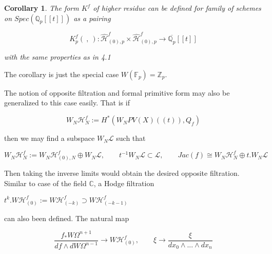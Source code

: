 \documentclass[12pt,twoside]{amsart}
\newtheorem{corollary}[theorem]{Corollary}
\begin{document}
\vspace{0.5cm}

\begin{corollary}
The form $K^f$ of higher residue can be defined for family of schemes on $Spec(\mathbb{Q}_p[[t]])$ as a pairing

\[ K_p^f( \ , \ ):\widehat{\mathcal{H}}_{(0),p}^f \times \widehat{\mathcal{H}}_{(0),p}^f \to \overline{\mathbb{Q}_{p}}[[t]] \]

\vspace{0.5cm}

\noindent
with the same properties as in 4.1
\end{corollary}

\vspace{0.5cm}

The corollary is just the special case $W(\mathbb{F}_p)=\mathbb{Z}_p$.

\vspace{0.5cm}

\noindent
The notion of opposite filtration and formal primitive form may also be generalized to this case easily. That is 
if 

\[ W_N\mathcal{H}_{N}^f:=H^*(W_NPV(X)((t)), Q_f) \]

\vspace{0.5cm}

\noindent
then we may find a subspace $W_N\mathcal{L}$ such that 

\[ W_N\mathcal{H}_{N}^f :=  W_N\mathcal{H}_{(0),N}^f \oplus W_N\mathcal{L} , \qquad t^{-1}W_N\mathcal{L} \subset \mathcal{L} , \qquad Jac(f) \cong  W_N\mathcal{H}_{N}^f \oplus t.W_N\mathcal{L} \]

\vspace{0.5cm}

\noindent
Then taking the inverse limits would obtain the desired opposite filtration. Similar to case of the field $\mathbb{C}$, a Hodge filtration

\vspace{0.5cm}
 
\begin{center}
$t^k. W\mathcal{H}_{(0)}^f:=W\mathcal{H}_{(-k)}^f \supset  W\mathcal{H}_{(-k-1)}^f$ 
\end{center}

\vspace{0.5cm}

\noindent
can also been defined. The natural map

\[ \dfrac{f_*W\Omega^{n+1}}{df \wedge dW\Omega^{n-1}} \to  W\mathcal{H}_{(0)}^f, \qquad \xi \to \dfrac{\xi}{dx_0 \wedge ...\wedge dx_n} \]
\end{document}
